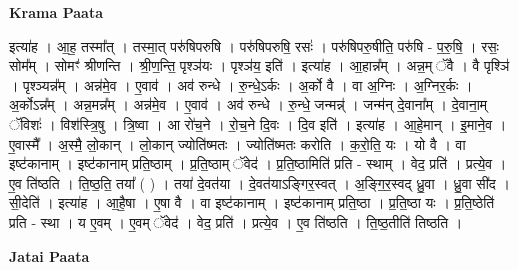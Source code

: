 \documentclass[17pt]{extarticle}
\begin{document}
\textbf{Krama Paata} \newline

इत्या॑ह । आ॒ह॒ तस्मा᳚त् । तस्मा॒त् परु॑षिपरुषि । परु॑षिपरुषि॒ रसः॑ । परु॑षिपरु॒षीति॒ परु॑षि - प॒रु॒षि॒ । रसः॒ सोम᳚म् । सोमꣳ॑ श्रीणन्ति । श्री॒ण॒न्ति॒ पृश्ञ॑यः । पृश्ञ॑य॒ इति॑ । इत्या॑ह । आ॒हान्न᳚म् । अन्न॒म् ॅवै । वै पृश्ञि॑ । पृश्ञ्यन्न᳚म् । अन्न॑मे॒व । ए॒वाव॑ । अव॑ रुन्धे । रु॒न्धे॒ऽर्कः । अ॒र्को वै । वा अ॒ग्निः । अ॒ग्निर॒र्कः । अ॒र्कोऽन्न᳚म् । अन्न॒मन्न᳚म् । अन्न॑मे॒व । ए॒वाव॑ । अव॑ रुन्धे । रु॒न्धे॒ जन्मन्न्॑ । जन्म॑न् दे॒वाना᳚म् । दे॒वाना॒म् ॅविशः॑ । विश॑स्त्रि॒षु । त्रि॒ष्वा । आ रो॑च॒ने । रो॒च॒ने दि॒वः । दि॒व इति॑ । इत्या॑ह । आ॒हे॒मान् । इ॒माने॒व । ए॒वास्मै᳚ । अ॒स्मै॒ लो॒कान् । लो॒कान् ज्योति॑ष्मतः । ज्योति॑ष्मतः करोति । क॒रो॒ति॒ यः । यो वै । वा इष्ट॑कानाम् । इष्ट॑कानाम् प्रति॒ष्ठाम् । प्र॒ति॒ष्ठाम् ॅवेद॑ । प्र॒ति॒ष्ठामिति॑ प्रति - स्थाम् । वेद॒ प्रति॑ । प्रत्ये॒व । ए॒व ति॑ष्ठति । ति॒ष्ठ॒ति॒ तया᳚ ( ) । तया॑ दे॒वत॑या । दे॒वत॑याऽङ्गिर॒स्वत् । अ॒ङ्गि॒र॒स्वद् ध्रु॒वा । ध्रु॒वा सी॑द । सी॒देति॑ । इत्या॑ह । आ॒है॒षा । ए॒षा वै । वा इष्ट॑कानाम् । इष्ट॑कानाम् प्रति॒ष्ठा । प्र॒ति॒ष्ठा यः । प्र॒ति॒ष्ठेति॑ प्रति - स्था । य ए॒वम् । ए॒वम् ॅवेद॑ । वेद॒ प्रति॑ । प्रत्ये॒व । ए॒व ति॑ष्ठति । ति॒ष्ठ॒तीति॑ तिष्ठति । \newline

\textbf{Jatai Paata} \newline
\end{document}
